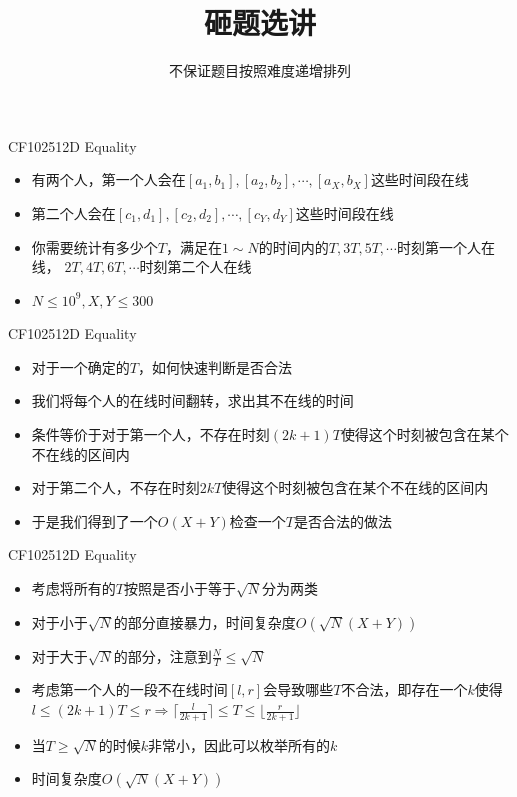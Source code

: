 \documentclass{beamer}
\begin{document}
\begin{frame}
    \title{砸题选讲}
    \author{不保证题目按照难度递增排列}
    \begin{titlepage}
    \end{titlepage}
\end{frame}

\begin{frame}{CF102512D Equality}
    \begin{itemize}
        \item 有两个人，第一个人会在$[a_1, b_1], [a_2, b_2], \cdots, [a_X, b_X]$这些时间段在线
        \item 第二个人会在$[c_1, d_1], [c_2, d_2], \cdots, [c_Y, d_Y]$这些时间段在线
        \item 你需要统计有多少个$T$，满足在$1\sim N$的时间内的$T, 3T, 5T,\cdots$时刻第一个人在线，
        $2T, 4T, 6T, \cdots$时刻第二个人在线
        \item $N \leq 10^9, X, Y\leq 300$
    \end{itemize}
\end{frame}

\begin{frame}{CF102512D Equality}
    \begin{itemize}
        \item 对于一个确定的$T$，如何快速判断是否合法
        \item 我们将每个人的在线时间翻转，求出其不在线的时间
        \item 条件等价于对于第一个人，不存在时刻$(2k + 1)T$使得这个时刻被包含在某个不在线的区间内
        \item 对于第二个人，不存在时刻$2kT$使得这个时刻被包含在某个不在线的区间内
        \item 于是我们得到了一个$O(X + Y)$检查一个$T$是否合法的做法
    \end{itemize}
\end{frame}

\begin{frame}{CF102512D Equality}
    \begin{itemize}
        \item 考虑将所有的$T$按照是否小于等于$\sqrt N$分为两类
        \item 对于小于$\sqrt N$的部分直接暴力，时间复杂度$O(\sqrt N(X + Y))$
        \item 对于大于$\sqrt N$的部分，注意到$\frac{N}{T} \leq \sqrt N$
        \item 考虑第一个人的一段不在线时间$[l, r]$会导致哪些$T$不合法，即存在一个$k$使得
        $l \leq (2k + 1)T \leq r \Rightarrow \lceil\frac{l}{2k + 1}\rceil \leq T \leq \lfloor\frac{r}{2k + 1}\rfloor$
        \item 当$T \geq \sqrt N$的时候$k$非常小，因此可以枚举所有的$k$
        \item 时间复杂度$O(\sqrt N(X + Y))$
    \end{itemize}
\end{frame}
\end{document}
